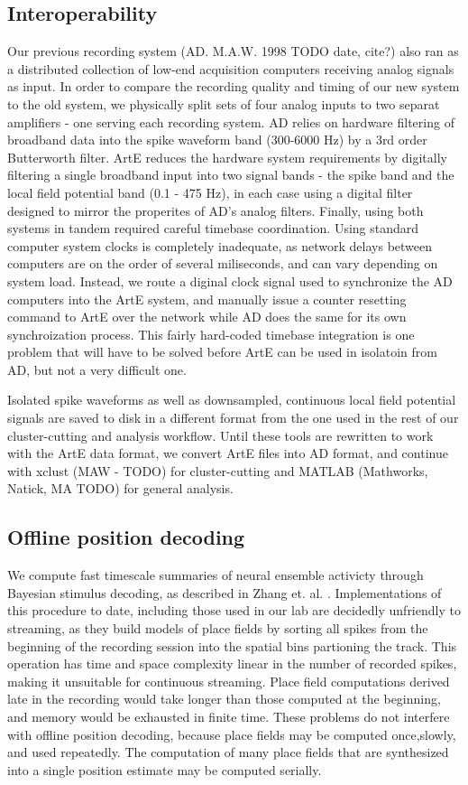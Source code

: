 \documentclass[10pt]{article}
\begin{document}
\subsection*{Interoperability}
Our previous recording system (AD. M.A.W. 1998 TODO date, cite?) also ran as a distributed collection of low-end acquisition computers receiving analog signals as input. In order to compare the recording quality and timing of our new system to the old system, we physically split sets of four analog inputs to two separat amplifiers - one serving each recording system. AD relies on hardware filtering of broadband data into the spike waveform band (300-6000 Hz) by a 3rd order Butterworth filter. ArtE reduces the hardware system requirements by digitally filtering a single broadband input into two signal bands - the spike band and the local field potential band (0.1 - 475 Hz), in each case using a digital filter designed to mirror the properites of AD's analog filters. Finally, using both systems in tandem required careful timebase coordination. Using standard computer system clocks is completely inadequate, as network delays between computers are on the order of several miliseconds, and can vary depending on system load. Instead, we route a diginal clock signal used to synchronize the AD computers into the ArtE system, and manually issue a counter resetting command to ArtE over the network while AD does the same for its own synchroization process. This fairly hard-coded timebase integration is one problem that will have to be solved before ArtE can be used in isolatoin from AD, but not a very difficult one.

Isolated spike waveforms as well as downsampled, continuous local field potential signals are saved to disk in a different format from the one used in the rest of our cluster-cutting and analysis workflow. Until these tools are rewritten to work with the ArtE data format, we convert ArtE files into AD format, and continue with xclust (MAW - TODO) for cluster-cutting and MATLAB (Mathworks, Natick, MA TODO) for general analysis.

\subsection*{Offline position decoding}
We compute fast timescale summaries of neural ensemble activicty through Bayesian stimulus decoding, as described in Zhang et. al. \cite{zhang1998interpreting}. Implementations of this procedure to date, including those used in our lab \cite{davidson2009hippocampal} are decidedly unfriendly to streaming, as they build models of place fields by sorting all spikes from the beginning of the recording session into the spatial bins partioning the track. This operation has time and space complexity linear in the number of recorded spikes, making it unsuitable for continuous streaming. Place field computations derived late in the recording would take longer than those computed at the beginning, and memory would be exhausted in finite time. These problems do not interfere with offline position decoding, because place fields may be computed once,slowly, and used repeatedly. The computation of many place fields that are synthesized into a single position estimate may be computed serially.
\end{document}
